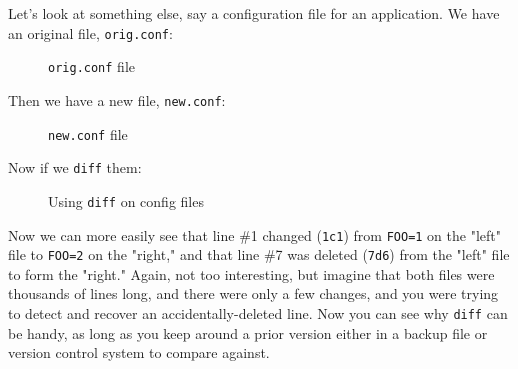 \documentclass[10pt,american,]{book}
\newenvironment{Shaded}{\begin{snugshade}}{\end{snugshade}}
\newcommand{\KeywordTok}[1]{\textcolor[rgb]{0.13,0.29,0.53}{\textbf{{#1}}}}
\newcommand{\OtherTok}[1]{\textcolor[rgb]{0.56,0.35,0.01}{{#1}}}
\newcommand{\NormalTok}[1]{{#1}}
\numberwithin{figure}{chapter}
\DeclareRobustCommand{\drcap}[1]{\begin{figure}[H]\caption{#1}\end{figure}}
\renewcommand{\KeywordTok}[1]{{#1}}
\renewcommand{\OtherTok}[1]{{#1}}
\renewcommand{\NormalTok}[1]{{#1}}
\begin{document}
Let's look at something else, say a configuration file for an
application. We have an original file, \texttt{orig.conf}:

\drcap{\texttt{orig.conf} file}

\begin{Shaded}
\end{Shaded}

Then we have a new file, \texttt{new.conf}:

\drcap{\texttt{new.conf} file}

\begin{Shaded}
\end{Shaded}

Now if we \texttt{diff} them:

\drcap{Using \texttt{diff} on config files}

\begin{Shaded}
\end{Shaded}

Now we can more easily see that line \#1 changed (\texttt{1c1}) from
\texttt{FOO=1} on the "left" file to \texttt{FOO=2} on the "right," and
that line \#7 was deleted (\texttt{7d6}) from the "left" file to form
the "right." Again, not too interesting, but imagine that both files
were thousands of lines long, and there were only a few changes, and you
were trying to detect and recover an accidentally-deleted line. Now you
can see why \texttt{diff} can be handy, as long as you keep around a
prior version either in a backup file or version control system to
compare against.
\end{document}
